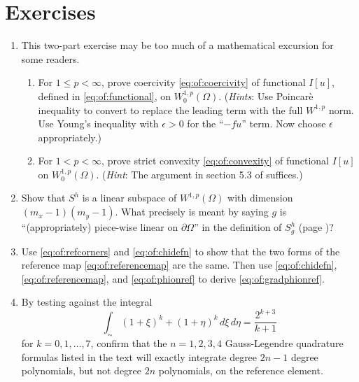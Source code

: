 

\section{Exercises}

\renewcommand{\labelenumi}{\arabic{chapter}.\arabic{enumi}\quad}
\renewcommand{\labelenumii}{(\alph{enumii})}
\begin{enumerate}
\item  \label{exer:of:twoproperties}  This two-part exercise may be too much of a mathematical excursion for some readers.
  \begin{enumerate}
  \item For $1 \le p < \infty$, prove coercivity \eqref{eq:of:coercivity} of functional $I[u]$, defined in \eqref{eq:of:functional}, on $W_0^{1,p}(\Omega)$.  (\emph{Hints}:  Use Poincar\`e inequality \citep[Theorem 6.30]{AdamsFournier2003} to convert to replace the leading term with the full $W^{1,p}$ norm.  Use Young's inequality with $\epsilon>0$ \citep[Appendix B]{Evans2010} for the ``$-fu$'' term.  Now choose $\epsilon$ appropriately.)
  \item For $1 < p < \infty$, prove strict convexity \eqref{eq:of:convexity} of functional $I[u]$ on $W_0^{1,p}(\Omega)$.  (\emph{Hint}:  The argument in section 5.3 of \citet{Ciarlet2002} suffices.)
  \end{enumerate}

\item Show that $S^h$ is a linear subspace of $W^{1,p}(\Omega)$ with dimension $(m_x-1)(m_y-1)$.  What precisely is meant by saying $g$ is ``(appropriately) piece-wise linear on $\partial\Omega$'' in the definition of $S_g^h$ (page \pageref{eq:of:Sghdefn})?

\item  Use \eqref{eq:of:refcorners} and \eqref{eq:of:chidefn} to show that the two forms of the reference map \eqref{eq:of:referencemap} are the same.  Then use \eqref{eq:of:chidefn}, \eqref{eq:of:referencemap}, and \eqref{eq:of:phionref} to derive \eqref{eq:of:gradphionref}.

\item By testing against the integral
    $$\int_{\square_\ast} (1+\xi)^k + (1+\eta)^k\,d\xi\, d\eta = \frac{2^{k+3}}{k+1}$$
for $k=0,1,\dots,7$, confirm that the $n=1,2,3,4$ Gauss-Legendre quadrature formulas listed in the text will exactly integrate degree $2n-1$ degree polynomials, but not degree $2n$ polynomials, on the reference element.


\end{enumerate}
